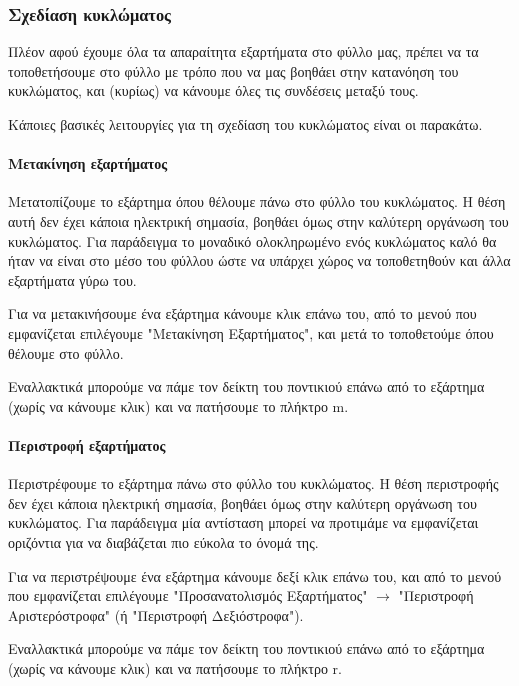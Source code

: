 \documentclass[a4paper]{article}
\begin{document}

\subsubsection{Σχεδίαση κυκλώματος}

Πλέον αφού έχουμε όλα τα απαραίτητα εξαρτήματα στο φύλλο μας, πρέπει να τα τοποθετήσουμε στο φύλλο με τρόπο που να μας βοηθάει στην κατανόηση του κυκλώματος, και (κυρίως) να κάνουμε όλες τις συνδέσεις μεταξύ τους.

Κάποιες βασικές λειτουργίες για τη σχεδίαση του κυκλώματος είναι οι παρακάτω.

\paragraph{Μετακίνηση εξαρτήματος}
Μετατοπίζουμε το εξάρτημα όπου θέλουμε πάνω στο φύλλο του κυκλώματος. Η θέση αυτή δεν έχει κάποια ηλεκτρική σημασία, βοηθάει όμως στην καλύτερη οργάνωση του κυκλώματος. Για παράδειγμα το μοναδικό ολοκληρωμένο ενός κυκλώματος καλό θα ήταν να είναι στο μέσο του φύλλου ώστε να υπάρχει χώρος να τοποθετηθούν και άλλα εξαρτήματα γύρω του.

Για να μετακινήσουμε ένα εξάρτημα κάνουμε κλικ επάνω του, από το μενού που εμφανίζεται επιλέγουμε "Μετακίνηση Εξαρτήματος", και μετά το τοποθετούμε όπου θέλουμε στο φύλλο. 

Εναλλακτικά μπορούμε να πάμε τον δείκτη του ποντικιού επάνω από το εξάρτημα (χωρίς να κάνουμε κλικ) και να πατήσουμε το πλήκτρο m.

\paragraph{Περιστροφή εξαρτήματος}
Περιστρέφουμε το εξάρτημα πάνω στο φύλλο του κυκλώματος. Η θέση περιστροφής δεν έχει κάποια ηλεκτρική σημασία, βοηθάει όμως στην καλύτερη οργάνωση του κυκλώματος. Για παράδειγμα μία αντίσταση μπορεί να προτιμάμε να εμφανίζεται οριζόντια για να διαβάζεται πιο εύκολα το όνομά της.

Για να περιστρέψουμε ένα εξάρτημα κάνουμε δεξί κλικ επάνω του, και από το μενού που εμφανίζεται επιλέγουμε "Προσανατολισμός Εξαρτήματος" $\rightarrow$ "Περιστροφή Αριστερόστροφα" (ή "Περιστροφή Δεξιόστροφα"). 

Εναλλακτικά μπορούμε να πάμε τον δείκτη του ποντικιού επάνω από το εξάρτημα (χωρίς να κάνουμε κλικ) και να πατήσουμε το πλήκτρο r.
\end{document}
